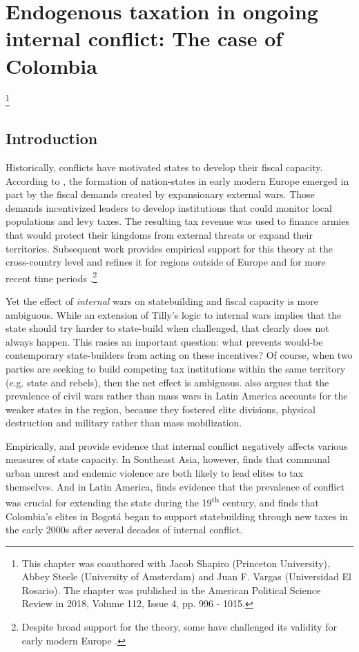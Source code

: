 \chapter{Endogenous taxation in ongoing internal conflict: The case of Colombia}\footnote{This chapter was coauthored with Jacob Shapiro (Princeton University), Abbey Steele (University of Amsterdam) and Juan F. Vargas (Universidad El Rosario). The chapter was published in the American Political Science Review in 2018, Volume 112, Issue 4, pp. 996 - 1015.} 

\section{Introduction}

Historically, conflicts have motivated states to develop their fiscal capacity. According to \citet{tilly92a}, the formation of nation-states in early modern Europe emerged in part by the fiscal demands created by expansionary external wars. Those demands incentivized leaders to develop institutions that could monitor local populations and levy taxes. The resulting tax revenue was used to finance armies that would protect their kingdoms from external threats or expand their territories. Subsequent work provides empirical support for this theory at the cross-country level \citep{besleypersson08a} and refines it for regions outside of Europe \citep{centeno03a, vu10b} and for more recent time periods \citep{schevestasavage12a}.\footnote{Despite broad support for the theory, some have challenged its validity for early modern Europe \citep[e.g.,][]{spruyt96a, ertman97a, gorski93a}.} 

Yet the effect of \textit{internal} wars on statebuilding and fiscal capacity is more ambiguous. While an extension of Tilly's logic to internal wars implies that the state should try harder to state-build when challenged, that clearly does not always happen. This rasies an important question: what prevents would-be contemporary state-builders from acting on these incentives? Of course, when two parties are seeking to build competing tax institutions within the same territory (e.g. state and rebels), then the net effect is ambiguous. \citet{centeno03a} also argues that the prevalence of civil wars rather than mass wars in Latin America accounts for the weaker states in the region, because they fostered elite divisions, physical destruction and military rather than mass mobilization. 

Empirically, \citet{besleypersson08a} and \citet{cardenaseslava14a} provide evidence that internal conflict negatively affects various measures of state capacity. In Southeast Asia, however, \citet{slater10a} finds that communal urban unrest and endemic violence are both likely to lead elites to tax themselves. And in Latin America, \citet{soifer15a} finds evidence that the prevalence of conflict was crucial for extending the state during the 19\textsuperscript{th} century, and \citet{rodriguez-franco16a} finds that Colombia's elites in Bogot\'{a} began  to support statebuilding through new taxes in the early 2000s after several decades of internal conflict.  
  
